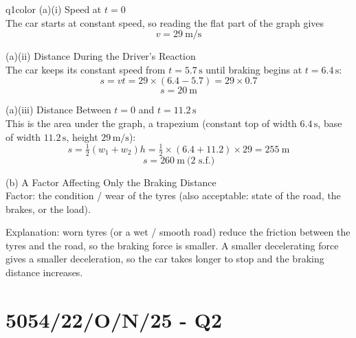 \documentclass[11pt,a4paper]{article}
\newcommand{\qsection}[1]{\needspace{10\baselineskip}\section*{#1}}
\begin{document}
\begin{ansbox}{q1color}
(a)(i) Speed at $t = 0$\\[4pt]
The car starts at constant speed, so reading the flat part of the graph gives
\[
v = \boxed{29\ \mathrm{m/s}}
\]

\vspace{4pt}
(a)(ii) Distance During the Driver's Reaction\\[4pt]
The car keeps its constant speed from $t = 5.7\,\mathrm{s}$ until braking begins at $t = 6.4\,\mathrm{s}$:
\[
s = vt = 29 \times (6.4 - 5.7) = 29 \times 0.7
\]
\[
s = \boxed{20\ \mathrm{m}}
\]

\vspace{4pt}
(a)(iii) Distance Between $t = 0$ and $t = 11.2\,\mathrm{s}$\\[4pt]
This is the area under the graph, a trapezium (constant top of width $6.4\,\mathrm{s}$, base of width $11.2\,\mathrm{s}$, height $29\,\mathrm{m/s}$):
\[
s = \tfrac{1}{2}(w_1 + w_2)h = \tfrac{1}{2} \times (6.4 + 11.2) \times 29 = 255\ \mathrm{m}
\]
\[
s = \boxed{260\ \mathrm{m}} \ \text{(2 s.f.)}
\]

\vspace{4pt}
(b) A Factor Affecting Only the Braking Distance\\[4pt]
Factor: the condition / wear of the tyres (also acceptable: state of the road, the brakes, or the load).

Explanation: worn tyres (or a wet / smooth road) reduce the friction between the tyres and the road, so the braking force is smaller. A smaller decelerating force gives a smaller deceleration, so the car takes longer to stop and the braking distance increases.
\end{ansbox}

\qsection{5054/22/O/N/25 - Q2}\label{p2_on25:q2}
\end{document}
